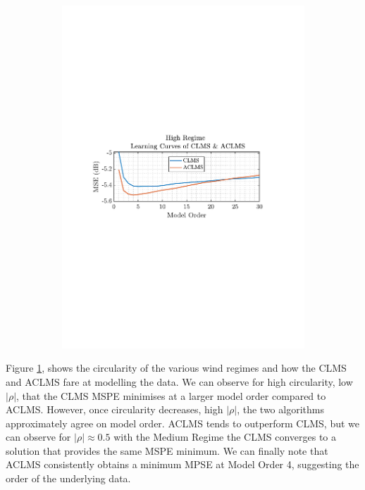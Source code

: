 \documentclass[12pt]{article}
\numberwithin{equation}{section}
\begin{document}
\begin{figure}[H]
\begin{subfigure}{0.49\textwidth}
					\includegraphics[trim={2.2cm 11.2cm 3.15cm  11.2cm}, clip, width=\textwidth]{../MATLAB/figures/q3_1b_fig07.pdf} 
				\end{subfigure}			
				\captionsetup{justification=centering}
				\label{fig: 3-1b}
			\end{figure}
		
		Figure \ref{fig: 3-1b}, shows the circularity of the various wind regimes and how the CLMS and ACLMS fare at modelling the data. We can observe for high circularity, low $|\rho|$, that the CLMS MSPE minimises at a larger model order compared to ACLMS. However, once circularity decreases, high $|\rho|$, the two algorithms approximately agree on model order. ACLMS tends to outperform CLMS, but we can observe for  $|\rho| \approx 0.5$ with the Medium Regime the CLMS converges to a solution that provides the same MSPE minimum. We can finally note that ACLMS consistently obtains a minimum MPSE at Model Order 4, suggesting the order of the underlying data.
	
\end{document}
